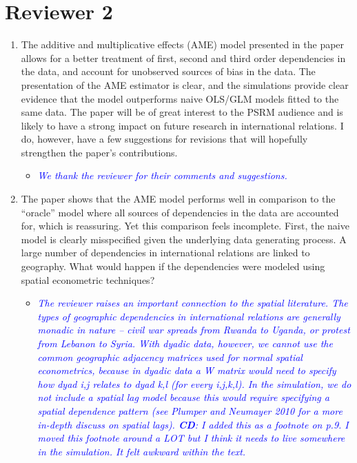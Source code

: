 \section*{Reviewer 2}

\begin{enumerate}
	\item The additive and multiplicative effects (AME) model presented in the paper allows for a better treatment of first, second and third order dependencies in the data, and account for unobserved sources of bias in the data. The presentation of the AME estimator is clear, and the simulations provide clear evidence that the model outperforms naive OLS/GLM models fitted to the same data. The paper will be of great interest to the PSRM audience and is likely to have a strong impact on future research in international relations. I do, however, have a few suggestions for revisions that will hopefully strengthen the paper’s contributions.
	\begin{itemize}
		\item \textcolor{blue}{ \emph{
		We thank the reviewer for their comments and suggestions.
		}}
	\end{itemize}
	\item The paper shows that the AME model performs well in comparison to the “oracle” model where all sources of dependencies in the data are accounted for, which is reassuring. Yet this comparison feels incomplete. First, the naive model is clearly misspecified given the underlying data generating process. A large number of dependencies in international relations are linked to geography. What would happen if the dependencies were modeled using spatial econometric techniques?
	\begin{itemize}
		\item \textcolor{blue}{ \emph{
			The reviewer raises an important connection to the spatial literature. The types of geographic dependencies in international relations are generally monadic in nature -- civil war spreads from Rwanda to Uganda, or protest from Lebanon to Syria. With dyadic data, however, we cannot use the common geographic adjacency matrices used for normal spatial econometrics, because in dyadic data a W matrix would need to specify how dyad i,j relates to dyad k,l (for every i,j,k,l). In the simulation, we do not include a spatial lag model because this would require specifying a spatial dependence pattern (see Plumper and Neumayer 2010 for a more in-depth discuss on spatial lags). \textbf{CD}: I added this as a footnote on p.9. I moved this footnote around a LOT but I think it needs to live somewhere in the simulation. It felt awkward within the text.
}}
\end{itemize}
\end{enumerate}
